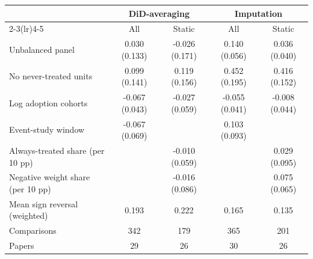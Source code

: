 \begin{tabular}{lcccc}
\toprule
 & \multicolumn{2}{c}{DiD-averaging} & \multicolumn{2}{c}{Imputation} \\
\cmidrule(lr){2-3}\cmidrule(lr){4-5}
 & All & Static & All & Static \\
\midrule
Unbalanced panel & 0.030 (0.133) & -0.026 (0.171) & 0.140 (0.056) & 0.036 (0.040) \\
No never-treated units & 0.099 (0.141) & 0.119 (0.156) & 0.452 (0.195) & 0.416 (0.152) \\
Log adoption cohorts & -0.067 (0.043) & -0.027 (0.059) & -0.055 (0.041) & -0.008 (0.044) \\
Event-study window & -0.067 (0.069) &  & 0.103 (0.093) &  \\
Always-treated share (per 10 pp) &  & -0.010 (0.059) &  & 0.029 (0.095) \\
Negative weight share (per 10 pp) &  & -0.016 (0.086) &  & 0.075 (0.065) \\
\midrule
Mean sign reversal (weighted) & 0.193 & 0.222 & 0.165 & 0.135 \\
Comparisons & 342 & 179 & 365 & 201 \\
Papers & 29 & 26 & 30 & 26 \\
\bottomrule
\end{tabular}
